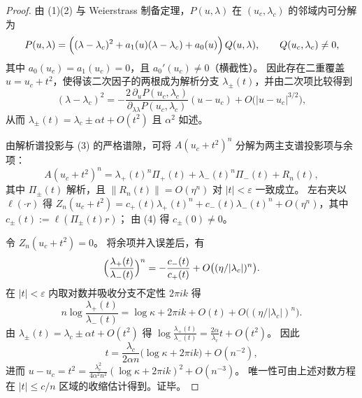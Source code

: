 \begin{proof}
由 (1)(2) 与 Weierstrass 制备定理，\(P(u,\lambda)\) 在 \((u_c,\lambda_c)\) 的邻域内可分解为
\[
P(u,\lambda)=\Bigl((\lambda-\lambda_c)^2+a_1(u)(\lambda-\lambda_c)+a_0(u)\Bigr)\,Q(u,\lambda),
\qquad Q(u_c,\lambda_c)\neq 0,
\]
其中 \(a_0(u_c)=a_1(u_c)=0\)，且 \(a_0'(u_c)\neq 0\)（横截性）。
因此存在二重覆盖 \(u=u_c+t^2\)，使得该二次因子的两根成为解析分支 \(\lambda_\pm(t)\)，并由二次项比较得到
\[
(\lambda-\lambda_c)^2
=
-\frac{2\,\partial_u P(u_c,\lambda_c)}{\partial_{\lambda\lambda}P(u_c,\lambda_c)}(u-u_c)
+O\bigl(|u-u_c|^{3/2}\bigr),
\]
从而 \(\lambda_\pm(t)=\lambda_c\pm\alpha t+O(t^2)\) 且 \(\alpha^2\) 如述。

由解析谱投影与 (3) 的严格谱隙，可将 \(A(u_c+t^2)^n\) 分解为两主支谱投影项与余项：
\[
A(u_c+t^2)^n=\lambda_+(t)^n\Pi_+(t)+\lambda_-(t)^n\Pi_-(t)+R_n(t),
\]
其中 \(\Pi_\pm(t)\) 解析，且 \(\|R_n(t)\|=O(\eta^n)\) 对 \(|t|<\varepsilon\) 一致成立。
左右夹以 \(\ell(\cdot r)\) 得
\(
Z_n(u_c+t^2)=c_+(t)\lambda_+(t)^n+c_-(t)\lambda_-(t)^n+O(\eta^n)
\)，其中 \(c_\pm(t):=\ell(\Pi_\pm(t)r)\)；
由 (4) 得 \(c_\pm(0)\neq 0\)。

令 \(Z_n(u_c+t^2)=0\)。
将余项并入误差后，有
\[
\Bigl(\frac{\lambda_+(t)}{\lambda_-(t)}\Bigr)^n=-\frac{c_-(t)}{c_+(t)}+O\bigl((\eta/|\lambda_c|)^n\bigr).
\]
在 \(|t|<\varepsilon\) 内取对数并吸收分支不定性 \(2\pi i k\) 得
\[
n\log\frac{\lambda_+(t)}{\lambda_-(t)}
=
\log\kappa+2\pi i k+O(t)+O\bigl((\eta/|\lambda_c|)^n\bigr).
\]
由 \(\lambda_\pm(t)=\lambda_c\pm\alpha t+O(t^2)\) 得
\(
\log\frac{\lambda_+(t)}{\lambda_-(t)}=\frac{2\alpha}{\lambda_c}t+O(t^2)
\)。
因此
\[
t=\frac{\lambda_c}{2\alpha n}\bigl(\log\kappa+2\pi i k\bigr)+O(n^{-2}),
\]
进而
\(
u-u_c=t^2=\frac{\lambda_c^2}{4\alpha^2n^2}(\log\kappa+2\pi i k)^2+O(n^{-3})
\)。
唯一性可由上述对数方程在 \(|t|\le c/n\) 区域的收缩估计得到。证毕。
\end{proof}

